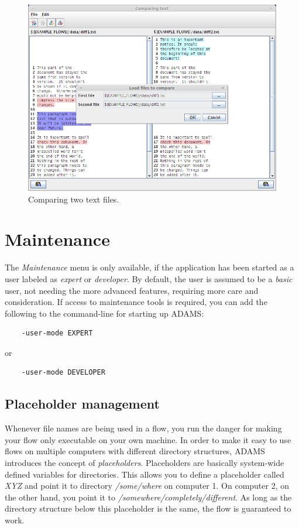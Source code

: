 \begin{figure}[htb]
  \centering
  \includegraphics[width=12.0cm]{images/diff-files.png}
  \caption{Comparing two text files.}
  \label{diff-files}
\end{figure}


\chapter{Maintenance}
The \textit{Maintenance} menu is only available, if the application has been
started as a user labeled as \textit{expert} or \textit{developer}. By default,
the user is assumed to be a \textit{basic} user, not needing the more advanced
features, requiring more care and consideration. If access to maintenance tools
is required, you can add the following to the command-line for starting up
ADAMS:
\begin{verbatim}
	-user-mode EXPERT
\end{verbatim}
or
\begin{verbatim}
	-user-mode DEVELOPER
\end{verbatim}

\newpage
\section{Placeholder management}
Whenever file names are being used in a flow, you run the danger for making
your flow only executable on your own machine. In order to make it easy to use
flows on multiple computers with different directory structures, ADAMS 
introduces the concept of \textit{placeholders}. Placeholders are basically 
system-wide defined variables for directories. This allows you to define a
placeholder called \textit{XYZ} and point it to directory \textit{/some/where}
on computer 1. On computer 2, on the other hand, you point it to 
\textit{/somewhere/completely/different}. As long as the directory structure
below this placeholder is the same, the flow is guaranteed to work.

